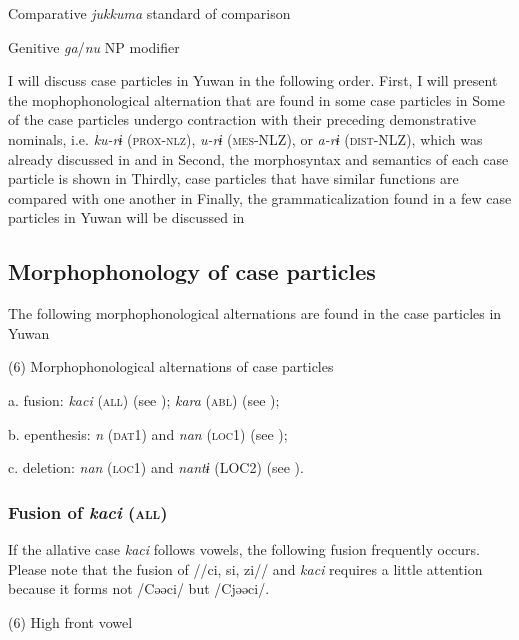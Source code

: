 Comparative  \textit{jukkuma}  standard of comparison

Genitive  \textit{ga}/\textit{nu}  NP modifier

I will discuss case particles in Yuwan in the following order. First, I will present the mophophonological alternation that are found in some case particles in  Some of the case particles undergo contraction with their preceding demonstrative nominals, i.e. \textit{ku-rɨ} (\textsc{prox}-\textsc{nlz}), \textit{u-rɨ} (\textsc{mes}-NLZ), or \textit{a-rɨ} (\textsc{dist}-NLZ), which was already discussed in  and  in  Second, the morphosyntax and semantics of each case particle is shown in  Thirdly, case particles that have similar functions are compared with one another in  Finally, the grammaticalization found in a few case particles in Yuwan will be discussed in 

\subsection{Morphophonology of case particles}

The following morphophonological alternations are found in the case particles in Yuwan

(6) Morphophonological alternations of case particles

  a. fusion:         \textit{kaci} (\textsc{all}) (see ); \textit{kara} (\textsc{abl}) (see );

b. epenthesis:         \textit{n} (\textsc{dat}1) and \textit{nan} (\textsc{loc}1) (see );

c. deletion:         \textit{nan} (\textsc{loc}1) and \textit{nantɨ} (LOC2) (see ).

\subsubsection{Fusion of \textit{kaci} (\textsc{all})}
\label{bkm:Ref365151806}
If the allative case \textit{kaci} follows vowels, the following fusion frequently occurs. Please note that the fusion of //ci, si, zi// and \textit{kaci} requires a little attention because it forms not /Cəəci/ but /Cjəəci/.

(6) \ea High front vowel\\
\gll

